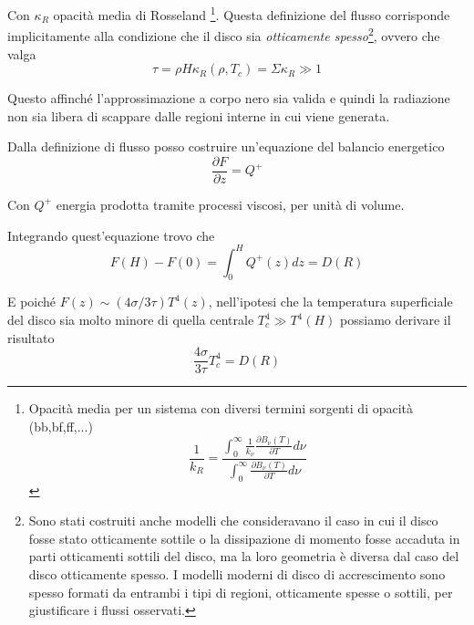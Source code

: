 \documentclass[a4paperbi]{article}
\begin{document}
	Con $\kappa_R$ opacità media di Rosseland
	\footnote{Opacità media per un sistema con diversi termini sorgenti di opacità (bb,bf,ff,...)\begin{equation}
																							\frac{1}{k_R}=\frac{\int_0^\infty\frac{1}{k_\nu}\frac{\partial B_\nu(T)}{\partial T}d\nu}{\int_0^\infty\frac{\partial B_\nu(T)}{\partial T}d\nu}
																						\end{equation}}.
Questa definizione del flusso corrisponde implicitamente alla condizione che il disco sia \textit{otticamente spesso}\footnote{Sono stati costruiti anche modelli che consideravano il caso in cui il disco fosse stato otticamente sottile o la dissipazione di momento fosse accaduta in parti otticamenti sottili del disco, ma la loro geometria è diversa dal caso del disco otticamente spesso. I modelli moderni di disco di accrescimento sono spesso formati da entrambi i tipi di regioni, otticamente spesse o sottili, per giustificare i flussi osservati.}, ovvero che valga
	\begin{equation}
		\tau=\rho H\kappa_R(\rho,T_c)=\Sigma\kappa_R\gg 1
	\end{equation}
	
	Questo affinché l'approssimazione a corpo nero sia valida e quindi la radiazione non sia libera di scappare dalle regioni interne in cui viene generata.
	
	Dalla definizione di flusso posso costruire un'equazione del balancio energetico
	\begin{equation}
		\frac{\partial F}{\partial z}=Q^+
	\end{equation}

	Con $Q^+$ energia prodotta tramite processi viscosi, per unità di volume.
	
	Integrando quest'equazione trovo che
	\begin{equation}
		F(H)-F(0)=\int_0^HQ^+(z)dz=D(R)
	\end{equation}

	E poiché $F(z)\sim(4\sigma/3\tau)T^4(z)$, nell'ipotesi che la temperatura superficiale del disco sia molto minore di quella centrale $T_c^4\gg T^4(H)$
	possiamo derivare il risultato
	\begin{equation}
		\frac{4\sigma}{3\tau}T^4_c=D(R)
	\end{equation}
	
\end{document}

